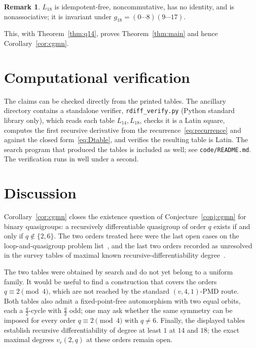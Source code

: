 \documentclass[11pt]{article}
\theoremstyle{definition}
\newtheorem{remark}[theorem]{Remark}
\begin{document}
\begin{remark}
$L_{18}$ is idempotent-free, noncommutative, has no identity, and is
nonassociative; it is invariant under $g_{18}=(0\cdots8)(9\cdots17)$.
\end{remark}

This, with Theorem~\ref{thm:q14}, proves Theorem~\ref{thm:main} and hence
Corollary~\ref{cor:cgmn}.

\section{Computational verification}\label{sec:comp}

The claims can be checked directly from the printed tables. The ancillary directory
contains a standalone verifier, \texttt{rdiff\_verify.py} (Python standard library only),
which reads each table $L_{14},L_{18}$, checks it is a Latin square, computes the first
recursive derivative from the recurrence~\eqref{eq:recurrence} and against the closed
form~\eqref{eq:Dtable}, and verifies the resulting table is Latin. The search program that
produced the tables is included as well; see \texttt{code/README.md}. The verification
runs in well under a second.

\section{Discussion}\label{sec:disc}

Corollary~\ref{cor:cgmn} closes the existence question of
Conjecture~\ref{conj:cgmn} for binary quasigroups: a recursively differentiable
quasigroup of order $q$ exists if and only if $q\notin\{2,6\}$. The two orders treated
here were the last open cases on the loop-and-quasigroup problem list~\cite{KV}, and the
last two orders recorded as unresolved in the survey tables of maximal known
recursive-differentiability degree~\cite{SyrbuKuz,Klimov}.

The two tables were obtained by search and do not yet belong to a uniform family. It
would be useful to find a construction that covers the orders $q\equiv 2\pmod 4$, which
are not reached by the standard $(v,4,1)$-PMD route. Both tables also admit a
fixed-point-free automorphism with two equal orbits, each a $\tfrac q2$-cycle with
$\tfrac q2$ odd; one may ask whether the same symmetry can be imposed for every order
$q\equiv 2\pmod 4$ with $q\ne 6$. Finally, the displayed tables establish recursive
differentiability of degree at least $1$ at $14$ and $18$; the exact maximal degrees
$v_r(2,q)$ at these orders remain open.
\end{document}
